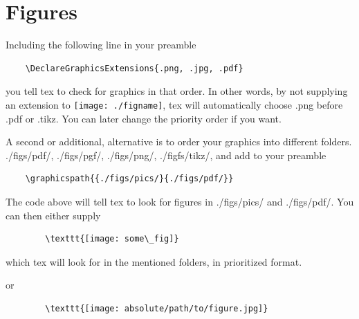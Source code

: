 \section{Figures}
    Including the following line in your preamble

    \begin{verbatim}
    \DeclareGraphicsExtensions{.png, .jpg, .pdf}
    \end{verbatim}

    you tell tex to check for graphics in that order. In other words, 
    by not supplying an extension to  \texttt{\texttt{[image: ./figname]}}, tex will automatically choose .png before .pdf or .tikz.
    You can later change the priority order if you want. 

    A second or additional, alternative is to order your graphics into different folders.
    ./figs/pdf/, ./figs/pgf/, ./figs/png/,  ./figfs/tikz/, and add to your preamble
    
    \begin{verbatim}
    \graphicspath{{./figs/pics/}{./figs/pdf/}}
    \end{verbatim}

    The code above will tell tex to look for figures in ./figs/pics/ and ./figs/pdf/.
    You can then either supply

    \begin{verbatim}
        \texttt{[image: some\_fig]}
    \end{verbatim}

    which tex will look for in the mentioned folders, in prioritized format. 

    or

    \begin{verbatim}
        \texttt{[image: absolute/path/to/figure.jpg]}
    \end{verbatim}

            




